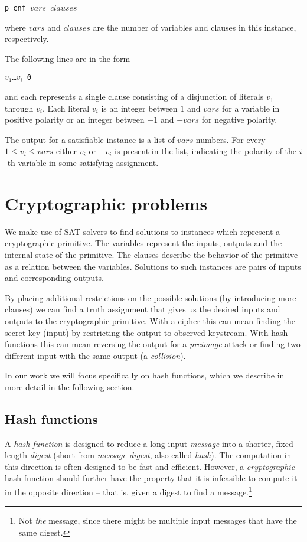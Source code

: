 \centerline{\texttt{p cnf $vars$ $clauses$}}

\noindent where $vars$ and $clauses$ are the number of variables and clauses in this instance, respectively.

The following lines are in the form

\centerline{\texttt{$v_1$\dots$v_i$ 0}}

\noindent and each represents a single clause consisting of a disjunction of literals $v_1$ through $v_i$.
Each literal $v_i$ is an integer between $1$ and $vars$ for a variable in positive polarity or an integer between $-1$ and $-vars$ for negative polarity.

The output for a satisfiable instance is a list of $vars$ numbers.
For every $1 \le v_i \le vars$ either $v_i$ or $-v_i$ is present in the list, indicating the polarity of the $i$-th variable in some satisfying assignment. 

\section{Cryptographic problems}
We make use of SAT solvers to find solutions to instances which represent a cryptographic primitive.
The variables represent the inputs, outputs and the internal state of the primitive.
The clauses describe the behavior of the primitive as a relation between the variables.
Solutions to such instances are pairs of inputs and corresponding outputs.

By placing additional restrictions on the possible solutions (by introducing more clauses) we can find a truth assignment that gives us the desired inputs and outputs to the cryptographic primitive.
With a cipher this can mean finding the secret key (input) by restricting the output to observed keystream.
With hash functions this can mean reversing the output for a \emph{preimage} attack or finding two different input with the same output (a \emph{collision}).

In our work we will focus specifically on hash functions, which we describe in more detail in the following section.

\subsection{Hash functions}
A \emph{hash function} is designed to reduce a long input \emph{message} into a shorter, fixed-length \emph{digest} (short from \emph{message digest}, also called \emph{hash}).
The computation in this direction is often designed to be fast and efficient.
However, a \emph{cryptographic} hash function should further have the property that it is infeasible to compute it in the opposite direction -- that is, given a digest to find a message.\footnote{Not \emph{the} message, since there might be multiple input messages that have the same digest.}

